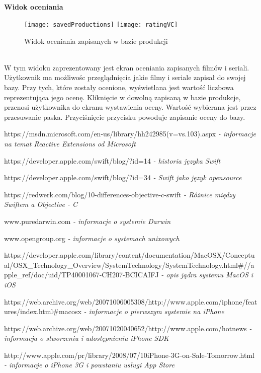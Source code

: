 \documentclass[12pt,oneside,a4paper]{report}
\begin{document}
\pagebreak
\subparagraph{}\textbf{Widok oceniania}
\begin{figure}[ht!]
	\centering
	\subfloat[]{}
	\texttt{[image: savedProductions]}
	\quad
	\subfloat[]{}
	\texttt{[image: ratingVC]}
	\caption{Widok oceniania zapisanych w bazie produkcji}
	\label{rating}
\end{figure}\\
W tym widoku zaprezentowany jest ekran oceniania zapisanych filmów i seriali. Użytkownik ma możliwośc przeglądnięcia jakie filmy i seriale zapisał do swojej bazy. Przy tych, które zostały ocenione, wyświetlana jest wartość liczbowa reprezentująca jego ocenę. Kliknięcie w dowolną zapisaną w bazie produkcje, przenosi użytkownika do ekranu wystawienia oceny. Wartość wybierana jest przez przesuwanie paska. Przyciśnięcie przycisku powoduje zapisanie oceny do bazy. 
\begin{thebibliography}{50}
 https://msdn.microsoft.com/en-us/library/hh242985(v=vs.103).aspx
\emph{- informacje na temat Reactive Extensions od Microsoft}

 https://developer.apple.com/swift/blog/?id=14
\emph{- historia języka Swift}

 https://developer.apple.com/swift/blog/?id=34
\emph{- Swift jako język opensource}

 https://redwerk.com/blog/10-differences-objective-c-swift
\emph{- Różnice między Swiftem a Objective - C}

 www.puredarwin.com 
\emph{ - informacje o systemie Darwin}

 www.opengroup.org \emph{ - informacje o systemach unixowych}

 https://developer.apple.com/library/content/documentation/MacOSX/Conceptual/OSX\_Technology\_Overview/SystemTechnology/SystemTechnology.html\#//apple\_ref/doc/uid/TP40001067-CH207-BCICAIFJ
\emph{ - opis jądra systemu MacOS i iOS}

 https://web.archive.org/web/20071006005308/http://www.apple.com/iphone/features/index.html\#macosx
\emph{ - informacje o pierwszym systemie na iPhone}

 https://web.archive.org/web/20071020040652/http://www.apple.com/hotnews
\emph{ - informacja o stworzeniu i udostępnieniu iPhone SDK}

 http://www.apple.com/pr/library/2008/07/10iPhone-3G-on-Sale-Tomorrow.html
\emph{ - informacje o iPhone 3G i powstaniu usługi App Store}


\end{thebibliography}
\end{document}
